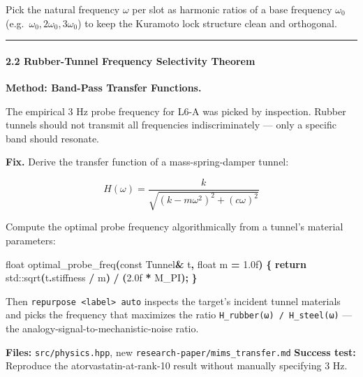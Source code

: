 \documentclass[
  11pt,
  a4paper,
]{article}
\newenvironment{Shaded}{\begin{snugshade}}{\end{snugshade}}
\newcommand{\AttributeTok}[1]{\textcolor[rgb]{0.13,0.29,0.53}{#1}}
\newcommand{\BuiltInTok}[1]{#1}
\newcommand{\ControlFlowTok}[1]{\textcolor[rgb]{0.13,0.29,0.53}{\textbf{#1}}}
\newcommand{\DataTypeTok}[1]{\textcolor[rgb]{0.13,0.29,0.53}{#1}}
\newcommand{\FloatTok}[1]{\textcolor[rgb]{0.00,0.00,0.81}{#1}}
\newcommand{\NormalTok}[1]{#1}
\newcommand{\OperatorTok}[1]{\textcolor[rgb]{0.81,0.36,0.00}{\textbf{#1}}}
\begin{document}
Pick the natural frequency \(\omega\) per slot as harmonic ratios of a
base frequency \(\omega_0\) (e.g.~\(\omega_0, 2\omega_0, 3\omega_0\)) to
keep the Kuramoto lock structure clean and orthogonal.

\begin{center}\rule{0.5\linewidth}{0.5pt}\end{center}

\paragraph{2.2 Rubber-Tunnel Frequency Selectivity
Theorem}\label{rubber-tunnel-frequency-selectivity-theorem}

\textbf{Method: Band-Pass Transfer Functions.}

The empirical 3 Hz probe frequency for L6-A was picked by inspection.
Rubber tunnels should not transmit all frequencies indiscriminately ---
only a specific band should resonate.

\textbf{Fix.} Derive the transfer function of a mass-spring-damper
tunnel:

\[
H(\omega) = \frac{k}{\sqrt{(k - m\omega^2)^2 + (c\omega)^2}}
\]

Compute the optimal probe frequency algorithmically from a tunnel's
material parameters:

\begin{Shaded}
\begin{Highlighting}[]
\DataTypeTok{float}\NormalTok{ optimal\_probe\_freq}\OperatorTok{(}\AttributeTok{const}\NormalTok{ Tunnel}\OperatorTok{\&}\NormalTok{ t}\OperatorTok{,} \DataTypeTok{float}\NormalTok{ m }\OperatorTok{=} \FloatTok{1.0}\BuiltInTok{f}\OperatorTok{)} \OperatorTok{\{}
    \ControlFlowTok{return} \BuiltInTok{std::}\NormalTok{sqrt}\OperatorTok{(}\NormalTok{t}\OperatorTok{.}\NormalTok{stiffness }\OperatorTok{/}\NormalTok{ m}\OperatorTok{)} \OperatorTok{/} \OperatorTok{(}\FloatTok{2.0}\BuiltInTok{f} \OperatorTok{*}\NormalTok{ M\_PI}\OperatorTok{);}
\OperatorTok{\}}
\end{Highlighting}
\end{Shaded}

Then \texttt{repurpose\ \textless{}label\textgreater{}\ auto} inspects
the target's incident tunnel materials and picks the frequency that
maximizes the ratio \texttt{H\_rubber(ω)\ /\ H\_steel(ω)} --- the
analogy-signal-to-mechanistic-noise ratio.

\textbf{Files:} \texttt{src/physics.hpp}, new
\texttt{research-paper/mims\_transfer.md} \textbf{Success test:}
Reproduce the atorvastatin-at-rank-10 result without manually specifying
3 Hz.
\end{document}
